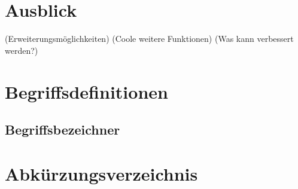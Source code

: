 \documentclass[
    load-dhbw-templates,
    load-preamble = true,
    auto-intro-pages = all,
    add-tocs-to-toc,
    debug = true,
    language = english,
    mainlanguage = ngerman,
    add-bibliography,
    bib-file = dhbw-source.bib,
    biblatex/style = alphabetic, 
]{iodhbwm}
\begin{document}
\chapter{Ausblick}
    (Erweiterungsmöglichkeiten)
    (Coole weitere Funktionen)
    (Was kann verbessert werden?)

\appendix
\chapter{Begriffsdefinitionen}

\section{Begriffsbezeichner} \label{sec:Begriffsbezeichner}




\chapter{Abkürzungsverzeichnis}




\nocite{*}
\end{document}
